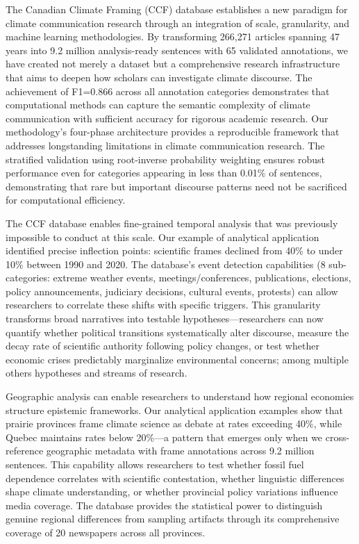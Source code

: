 \documentclass[12pt]{article}
\begin{document}
The Canadian Climate Framing (CCF) database establishes a new paradigm for climate communication research through an integration of scale, granularity, and machine learning methodologies. By transforming 266,271 articles spanning 47 years into 9.2 million analysis-ready sentences with 65 validated annotations, we have created not merely a dataset but a comprehensive research infrastructure that aims to deepen how scholars can investigate climate discourse. The achievement of F1=0.866 across all annotation categories demonstrates that computational methods can capture the semantic complexity of climate communication with sufficient accuracy for rigorous academic research. Our methodology's four-phase architecture provides a reproducible framework that addresses longstanding limitations in climate communication research. The stratified validation using root-inverse probability weighting ensures robust performance even for categories appearing in less than 0.01\% of sentences, demonstrating that rare but important discourse patterns need not be sacrificed for computational efficiency.

The CCF database enables fine-grained temporal analysis that was previously impossible to conduct at this scale. Our example of analytical application identified precise inflection points: scientific frames declined from 40\% to under 10\% between 1990 and 2020. The database's event detection capabilities (8 sub-categories: extreme weather events, meetings/conferences, publications, elections, policy announcements, judiciary decisions, cultural events, protests) can allow researchers to correlate these shifts with specific triggers. This granularity transforms broad narratives into testable hypotheses—researchers can now quantify whether political transitions systematically alter discourse, measure the decay rate of scientific authority following policy changes, or test whether economic crises predictably marginalize environmental concerns; among multiple others hypotheses and streams of research.

Geographic analysis can enable researchers to understand how regional economies structure epistemic frameworks. Our analytical application examples show that prairie provinces frame climate science as debate at rates exceeding 40\%, while Quebec maintains rates below 20\%—a pattern that emerges only when we cross-reference geographic metadata with frame annotations across 9.2 million sentences. This capability allows researchers to test whether fossil fuel dependence correlates with scientific contestation, whether linguistic differences shape climate understanding, or whether provincial policy variations influence media coverage. The database provides the statistical power to distinguish genuine regional differences from sampling artifacts through its comprehensive coverage of 20 newspapers across all provinces.
\end{document}

